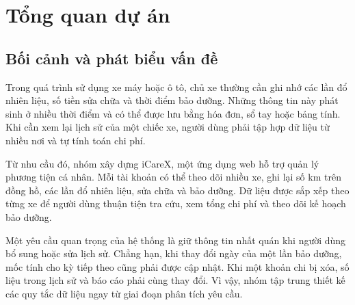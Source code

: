 \chapter{Tổng quan dự án}\label{chap:overview}
\section{Bối cảnh và phát biểu vấn đề}
Trong quá trình sử dụng xe máy hoặc ô tô, chủ xe thường cần ghi nhớ các lần đổ nhiên liệu, số tiền sửa chữa và thời điểm bảo dưỡng. Những thông tin này phát sinh ở nhiều thời điểm và có thể được lưu bằng hóa đơn, sổ tay hoặc bảng tính. Khi cần xem lại lịch sử của một chiếc xe, người dùng phải tập hợp dữ liệu từ nhiều nơi và tự tính toán chi phí.

Từ nhu cầu đó, nhóm xây dựng iCareX, một ứng dụng web hỗ trợ quản lý phương tiện cá nhân. Mỗi tài khoản có thể theo dõi nhiều xe, ghi lại số km trên đồng hồ, các lần đổ nhiên liệu, sửa chữa và bảo dưỡng. Dữ liệu được sắp xếp theo từng xe để người dùng thuận tiện tra cứu, xem tổng chi phí và theo dõi kế hoạch bảo dưỡng.

Một yêu cầu quan trọng của hệ thống là giữ thông tin nhất quán khi người dùng bổ sung hoặc sửa lịch sử. Chẳng hạn, khi thay đổi ngày của một lần bảo dưỡng, mốc tính cho kỳ tiếp theo cũng phải được cập nhật. Khi một khoản chi bị xóa, số liệu trong lịch sử và báo cáo phải cùng thay đổi. Vì vậy, nhóm tập trung thiết kế các quy tắc dữ liệu ngay từ giai đoạn phân tích yêu cầu.

